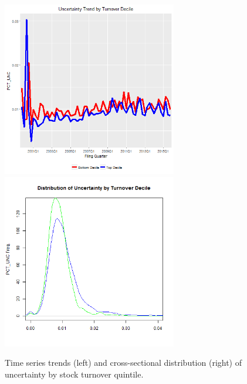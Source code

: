 \begin{figure}[H] 
\centering
\includegraphics[width=3in, height=3in]{figures/punc-by-turn-ts}
\includegraphics[width=3in, height=3in]{figures/punc-by-turn-xs}
\captionsetup{justification=centering, width=.95\textwidth} 
\caption{\footnotesize Time series trends (left) and cross-sectional distribution (right) of uncertainty by stock turnover quintile.} \label{bunc-turn}
\end{figure} 
\newpage
